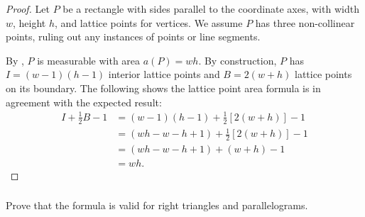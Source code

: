 \documentclass{report}
\begin{document}
\begin{proof}

  Let $P$ be a rectangle with sides parallel to the coordinate axes, with width
    $w$, height $h$, and lattice points for vertices.
  We assume $P$ has three non-collinear points, ruling out any instances of
    points or line segments.

  By , $P$ is measurable with area $a(P) = wh$.
  By construction, $P$ has $I = (w - 1)(h - 1)$ interior lattice points and
    $B = 2(w + h)$ lattice points on its boundary.
  The following shows the lattice point area formula is in agreement with
    the expected result:
    \begin{align*}
      I + \frac{1}{2}B - 1
        & = (w - 1)(h - 1) + \frac{1}{2}\left[ 2(w + h) \right] - 1 \\
        & = (wh - w - h + 1) + \frac{1}{2}\left[ 2(w + h) \right] - 1 \\
        & = (wh - w - h + 1) + (w + h) - 1 \\
        & = wh.
    \end{align*}

\end{proof}

\subsubsection{}%
\label{ssub:exercise-1.7.4b}

Prove that the formula is valid for right triangles and parallelograms.
\end{document}
